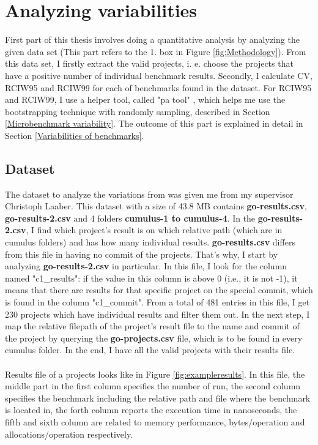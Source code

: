 \documentclass{seal_thesis}
\begin{document}
\section{Analyzing variabilities}
\label{Analyzing variabilities}

First part of this thesis involves doing a quantitative analysis by analyzing the given data set (This part refers to the 1. box in Figure \ref{fig:Methodology}). From this data set, I firstly extract the valid projects, i. e. choose the projects that have a positive number of individual benchmark results. Secondly, I calculate CV, RCIW95 and RCIW99 for each of benchmarks found in the dataset. For RCIW95 and RCIW99, I use a helper tool, called "pa tool" \cite{patool}, which helps me use the bootstrapping technique with randomly sampling, described in Section \ref{Microbenchmark variability}. The outcome of this part is explained in detail in Section \ref{Variabilities of benchmarks}.


\subsection{Dataset}

The dataset to analyze the variations from was given me from my supervisor Christoph Laaber. This dataset with a size of 43.8 MB contains \textbf{go-results.csv}, \textbf{go-results-2.csv} and 4 folders \textbf{cumulus-1 to cumulus-4}. In the \textbf{go-results-2.csv}, I find which project's result is on which relative path (which are in cumulus folders) and has how many individual results. \textbf{go-results.csv} differs from this file in having no commit of the projects. That's why, I start by analyzing \textbf{go-results-2.csv} in particular. In this file, I look for the column named "c1\_results": if the value in this column is above 0 (i.e., it is not -1), it means that there are results for that specific project on the special commit, which is found in the column "c1\_commit". From a total of 481 entries in this file, I get 230 projects which have individual results and filter them out. In the next step, I map the relative filepath of the project's result file to the name and commit of the project by querying the \textbf{go-projects.csv} file, which is to be found in every cumulus folder. In the end, I have all the valid projects with their results file.\\
\\
Results file of a projects looks like in Figure \ref{fig:exampleresults}. In this file, the middle part in the first column specifies the number of run, the second column specifies the benchmark including the relative path and file where the benchmark is located in, the forth column reports the execution time in nanoseconds, the fifth and sixth column are related to memory performance, bytes/operation and allocations/operation respectively.
 
\end{document}
